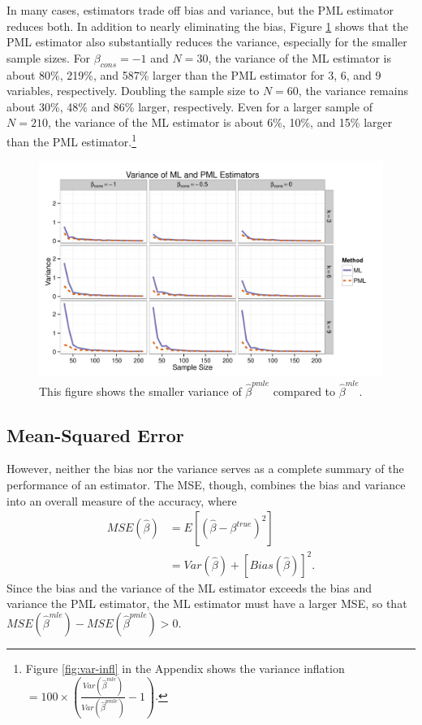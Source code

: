 \documentclass[12pt]{article}
\begin{document}
In many cases, estimators trade off bias and variance, but the PML estimator reduces both.
In addition to nearly eliminating the bias, Figure \ref{fig:sims-var} shows that the PML estimator also substantially reduces the variance, especially for the smaller sample sizes.
For $\beta_{cons} = -1$ and $N = 30$, the variance of the ML estimator is about 80\%, 219\%, and 587\% larger than the PML estimator for 3, 6, and 9 variables, respectively.
Doubling the sample size to $N = 60$, the variance remains about 30\%, 48\% and 86\% larger, respectively. 
Even for a larger sample of $N = 210$, the variance of the ML estimator is about 6\%, 10\%, and 15\% larger than the PML estimator.\footnote{Figure \ref{fig:var-infl} in the Appendix shows the variance inflation $= 100 \times \left(\frac{Var(\hat{\beta} ^{mle})}{Var(\hat{\beta}^{pmle})} - 1\right)$.}

\begin{figure}[h]
\begin{center}
\includegraphics[width = \textwidth]{figs/sims-var.pdf}
\caption{This figure shows the smaller variance of $\hat{\beta}^{pmle}$ compared to $\hat{\beta}^{mle}$.}\label{fig:sims-var}
\end{center}
\end{figure}

\subsection*{Mean-Squared Error}

However, neither the bias nor the variance serves as a complete summary of the performance of an estimator.
The MSE, though, combines the bias and variance into an overall measure of the accuracy, where
\begin{align}\label{eqn:mse}
MSE(\hat{\beta}) &= E[(\hat{\beta} - \beta^{true})^2] \nonumber\\
                            &= Var(\hat{\beta}) + [Bias(\hat{\beta})]^2 \text{.}
\end{align}
Since the bias and the variance of the ML estimator exceeds the bias and variance the PML estimator, the ML estimator must have a larger MSE, so that $MSE(\hat{\beta}^{mle}) - MSE(\hat{\beta}^{pmle}) > 0$.
\end{document}
